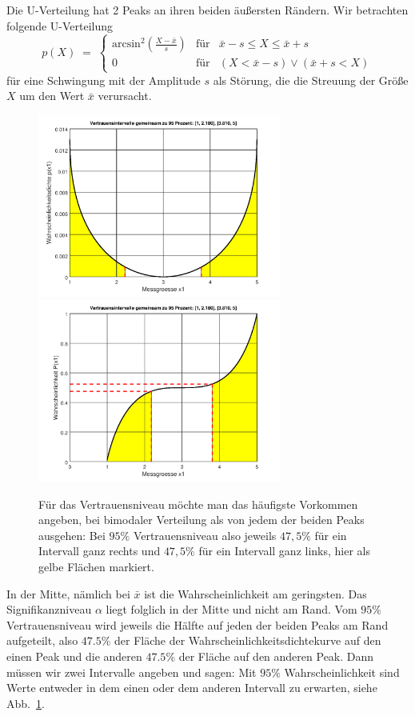 Die U-Verteilung hat 2 Peaks an ihren beiden äußersten Rändern.
Wir betrachten folgende U-Verteilung
\begin{equation}
p(X) \; = \; \left\{\begin{array}{lll}
\mathrm{arcsin}^2\left(\frac{X - \bar x}{s}\right) & \text{für} & \bar x - s  \leq X \leq \bar x + s\\
0 & \text{für} & (X < \bar x - s) \vee (\bar x + s < X)
\end{array}\right.
\label{uverteilung}
\end{equation}
für eine Schwingung mit der Amplitude $s$ als Störung, die die Streuung der Größe $X$
um den Wert $\bar x$ verursacht.
\begin{figure}
	\begin{center}
 		\includegraphics[width=80mm]{11_vorlesung_GUMS1/media/pdf_Uverteilung_Vertrauensniveau.png}
 		\hspace{2mm}
	\includegraphics[width=80mm]{11_vorlesung_GUMS1/media/Pkum_Uverteilung_Vertrauensniveau.png}
		\caption{Für das Vertrauensniveau möchte man das häufigste Vorkommen angeben, bei
			bimodaler Verteilung als von jedem der beiden Peaks ausgehen: Bei $95 \%$
			Vertrauensniveau also jeweils $47,5 \%$ für ein Intervall ganz rechts und
			$47,5 \%$ für ein Intervall ganz links, hier als gelbe Flächen markiert.}
		\label{Uverteilungsquantile}
	\end{center}
\end{figure}
In der Mitte, nämlich bei $\bar x$ ist die Wahrscheinlichkeit am geringsten.
Das Signifikanzniveau $\alpha$ liegt folglich in der Mitte und nicht am Rand.
Vom $95 \%$ Vertrauensniveau wird jeweils die Hälfte auf jeden der beiden
Peaks am Rand aufgeteilt, also $47.5 \%$ der Fläche der
Wahrscheinlichkeitsdichtekurve auf den einen Peak und die anderen $47.5 \%$ der Fläche auf den anderen
Peak. Dann müssen wir zwei Intervalle angeben und sagen: Mit $95 \%$ Wahrscheinlichkeit sind
Werte entweder in dem einen oder dem anderen Intervall zu erwarten, siehe Abb.~\ref{Uverteilungsquantile}.

